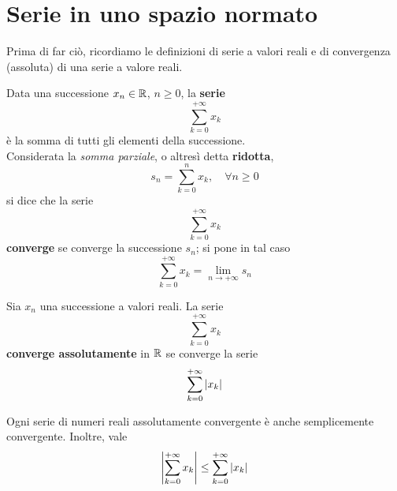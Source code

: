 \section{Serie in uno spazio normato}
Prima di far ciò, ricordiamo le definizioni di serie a valori reali e di convergenza (assoluta) di una serie a valore reali.
\begin{define}
	Data una successione $x_n\in\mathbb{R}$, $n\geq 0$, la \textbf{serie}
	\begin{equation}
		\sum_{k=0}^{+\infty}x_k
	\end{equation}
	è la somma di tutti gli elementi della successione.\\
	Considerata la \textit{somma parziale}, o altresì detta \textbf{ridotta},
	\begin{equation}
		s_n=\sum_{k=0}^{n}x_k,\quad\forall n\geq 0
	\end{equation}
si dice che la serie
\begin{equation*}
	\sum_{k=0}^{+\infty}x_k
\end{equation*}
\textbf{converge} se converge la successione $s_n$; si pone in tal caso
\begin{equation}
	\sum_{k=0}^{+\infty}x_k=\lim_{n\to+\infty}s_n
\end{equation}
\end{define}
\begin{define}
	Sia $x_n$ una successione a valori reali. La serie
	\begin{equation*}
		\sum_{k=0}^{+\infty}x_k
	\end{equation*}
	\textbf{converge assolutamente} in $\mathbb{R}$ se converge la serie
	\begin{equation}
		\sum_{k=0}^{+\infty}\abs{x_k}
	\end{equation}
\end{define}
\begin{theorema}\label{teoremaassimplicasemplice}
	Ogni serie di numeri reali assolutamente convergente è anche semplicemente convergente. Inoltre, vale
	\begin{equation}
		\abs{\sum_{k=0}^{+\infty}x_k}\leq\sum_{k=0}^{+\infty}\abs{x_k}
	\end{equation}
\end{theorema}
